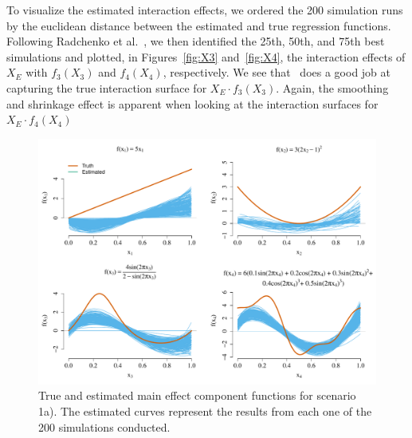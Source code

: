 To visualize the estimated interaction effects, we ordered the 200 simulation runs by the euclidean distance between the estimated and true regression functions. Following Radchenko et al.~\citep{radchenko2010variable}, we then identified the 25th, 50th, and 75th best simulations and plotted, in Figures~\ref{fig:X3} and~\ref{fig:X4}, the interaction effects of $X_E$ with $f_3(X_3)$ and $f_4(X_4)$, respectively. We see that \sail ~does a good job at capturing the true interaction surface for $X_E \cdot f_3(X_3)$. Again, the smoothing and shrinkage effect is apparent when looking at the interaction surfaces for $X_E \cdot f_4(X_4)$


\begin{figure}[H]
	\centering
	\includegraphics[scale=0.61]{figs/sail_main_eff_paramIndex1_200sims.pdf}
	\caption{True and estimated main effect component functions for scenario 1a). The estimated curves represent the results from each one of the 200 simulations conducted.}\label{fig:main_eff}
\end{figure}


